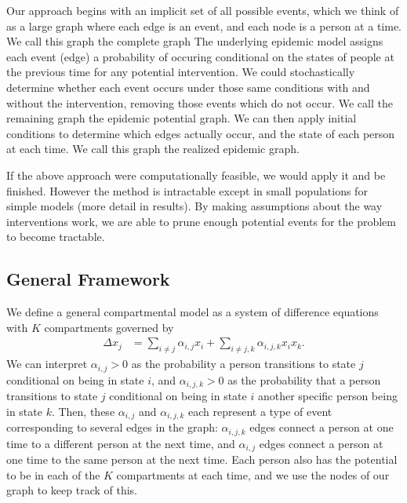 \documentclass[PTRSB]{rsos}
\begin{document}
\begin{multicols}{2}
Our approach begins with an implicit set of all possible events, which we think of as a large graph where each edge is an event, and each node is a person at a time. %
We call this graph the complete graph
The underlying epidemic model assigns each event (edge) a probability of occuring conditional on the states of people at the previous time for any potential intervention.
We could stochastically determine whether each event occurs under those same conditions with and without the intervention, removing those events which do not occur.
We call the remaining graph the epidemic potential graph.
We can then apply initial conditions to determine which edges actually occur, and the state of each person at each time.
We call this graph the realized epidemic graph.

If the above approach were computationally feasible, we would apply it and be finished.
However the method is intractable except in small populations for simple models (more detail in results).
By making assumptions about the way interventions work, we are able to prune enough potential events for the problem to become tractable.

\subsection*{General Framework}
We define a general compartmental model as a system of difference equations with $K$ compartments governed by 
\begin{align*}
\Delta x_{j} &= \sum_{i \neq j} \alpha_{i,j}x_i + \sum_{i \neq j, k} \alpha_{i,j,k} x_ix_k.
\end{align*}
We can interpret $\alpha_{i,j} > 0$ as the probability a person transitions to state $j$ conditional on being in state $i$, and $\alpha_{i,j,k} > 0$ as the probability that a person transitions to state $j$ conditional on being in state $i$ another specific person being in state $k$.
Then, these $\alpha_{i,j}$ and $\alpha_{i,j,k}$ each represent a type of event corresponding to several edges in the graph: $\alpha_{i,j,k}$ edges connect a person at one time to a different person at the next time, and $\alpha_{i,j}$ edges connect a person at one time to the same person at the next time.
Each person also has the potential to be in each of the $K$ compartments at each time, and we use the nodes of our graph to keep track of this.


\end{multicols}
\end{document}
